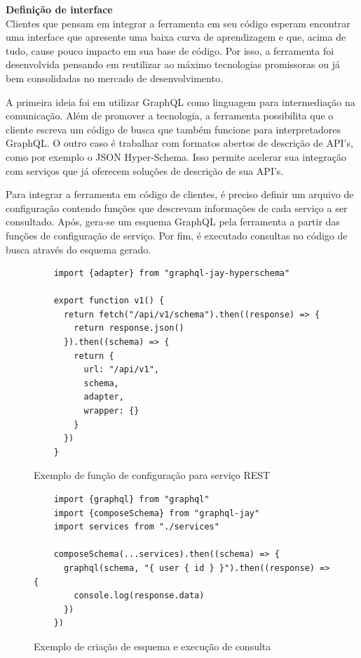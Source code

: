 \textbf{Definição de interface} \\

Clientes que pensam em integrar a ferramenta em seu código esperam encontrar uma interface que apresente uma baixa curva de aprendizagem e que, acima de tudo, cause pouco impacto em sua base de código. Por isso, a ferramenta foi desenvolvida pensando em reutilizar ao máximo tecnologias promissoras ou já bem consolidadas no mercado de desenvolvimento.

A primeira ideia foi em utilizar GraphQL como linguagem para intermediação na comunicação. Além de promover a tecnologia, a ferramenta possibilita que o cliente escreva um código de busca que também funcione para interpretadores GraphQL. O outro caso é trabalhar com formatos abertos de descrição de API's, como por exemplo o JSON Hyper-Schema. Isso permite acelerar sua integração com serviços que já oferecem soluções de descrição de sua API's.

Para integrar a ferramenta em código de clientes, é preciso definir um arquivo de configuração contendo funções que descrevam informações de cada serviço a ser consultado. Após, gera-se um esquema GraphQL pela ferramenta a partir das funções de configuração de serviço. Por fim, é executado consultas no código de busca através do esquema gerado.

\begin{figure}[H]
  \centering
  \begin{verbatim}
    import {adapter} from "graphql-jay-hyperschema"
  
    export function v1() {
      return fetch("/api/v1/schema").then((response) => {
        return response.json()
      }).then((schema) => {
        return {
          url: "/api/v1",
          schema,
          adapter,
          wrapper: {}
        }
      })
    }
  \end{verbatim}
  \caption{Exemplo de função de configuração para serviço REST}
\end{figure}

\begin{figure}[H]
  \centering
  \begin{verbatim}
    import {graphql} from "graphql"
    import {composeSchema} from "graphql-jay"
    import services from "./services"
    
    composeSchema(...services).then((schema) => {
      graphql(schema, "{ user { id } }").then((response) => { 
        console.log(response.data)
      })
    })
  \end{verbatim}
  \caption{Exemplo de criação de esquema e execução de consulta}
\end{figure}

